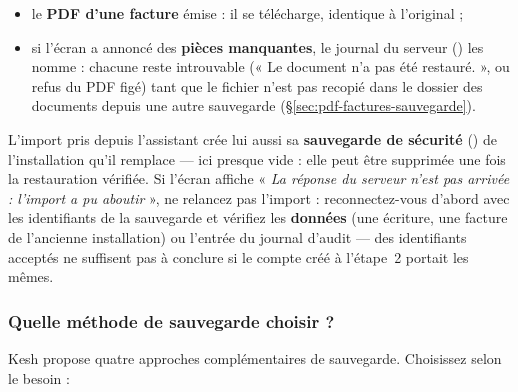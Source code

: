 \documentclass[a4paper,11pt,oneside]{article}
\begin{document}
\begin{enumerate}
\begin{itemize}
        \item le \textbf{PDF d'une facture} émise : il se télécharge, identique à l'original ;
        \item si l'écran a annoncé des \textbf{pièces manquantes}, le journal du serveur () les nomme : chacune reste introuvable (« Le document n'a pas été restauré. », ou refus du PDF figé) tant que le fichier n'est pas recopié dans le dossier des documents depuis une autre sauvegarde (\S\ref{sec:pdf-factures-sauvegarde}).
    \end{itemize}
\end{enumerate}

\begin{keshnote}
L'import pris depuis l'assistant crée lui aussi sa \textbf{sauvegarde de sécurité} () de l'installation qu'il remplace --- ici presque vide : elle peut être supprimée une fois la restauration vérifiée. Si l'écran affiche « \emph{La réponse du serveur n'est pas arrivée : l'import a pu aboutir} », ne relancez pas l'import : reconnectez-vous d'abord avec les identifiants de la sauvegarde et vérifiez les \textbf{données} (une écriture, une facture de l'ancienne installation) ou l'entrée  du journal d'audit --- des identifiants acceptés ne suffisent pas à conclure si le compte créé à l'étape~2 portait les mêmes.
\end{keshnote}

\subsubsection{Quelle méthode de sauvegarde choisir ?}

Kesh propose quatre approches complémentaires de sauvegarde. Choisissez selon le besoin :
\end{document}
